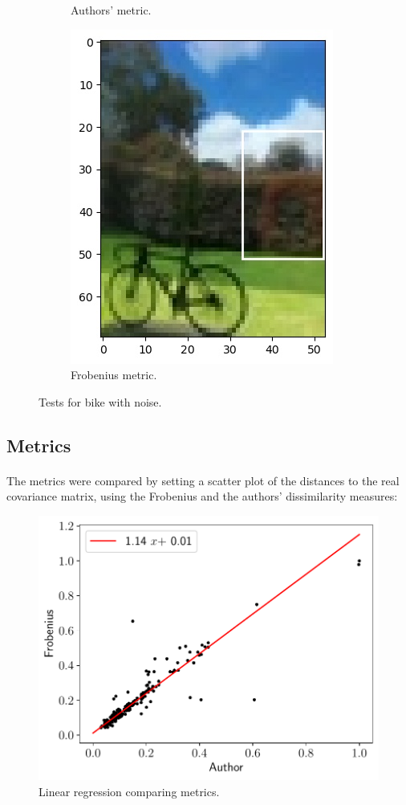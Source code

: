 \documentclass{beamer}
\theoremstyle{definition}
\theoremstyle{remark}
\theoremstyle{example}
\newif\ifinsection
\newif\ifinsubsection
\let\oldsubsection\subsection
\renewcommand{\subsection}{
  \global\insubsectiontrue
  \oldsubsection}
\newcommand {\aframe}[1] {
  \begin{frame}
    \ifinsection\frametitle{\secname}\fi
    \ifinsubsection\framesubtitle{\subsecname}\fi
  #1
  \end{frame}
}
\begin{document}
{\begin{figure}
\begin{subfigure}[b]{0.32\textwidth}
      \caption{Authors' metric.}
    \end{subfigure}
    \begin{subfigure}[b]{0.32\textwidth}
      \centering \includegraphics[width=\textwidth]{figs/0-4-1-test_case1.jpg}
      \caption{Frobenius metric.}
    \end{subfigure}
    \caption{Tests for bike with noise.}
\end{figure}
}

\subsection{Metrics}
\aframe{ The metrics were compared by setting a scatter plot of the distances to
  the real covariance matrix, using the Frobenius and the authors' dissimilarity
  measures:
  \begin{figure}[H]
    \centering \includegraphics[width=0.5\linewidth]{figs/linear.pdf}
    \caption{Linear regression comparing metrics.}
  \end{figure}
}
\end{document}
